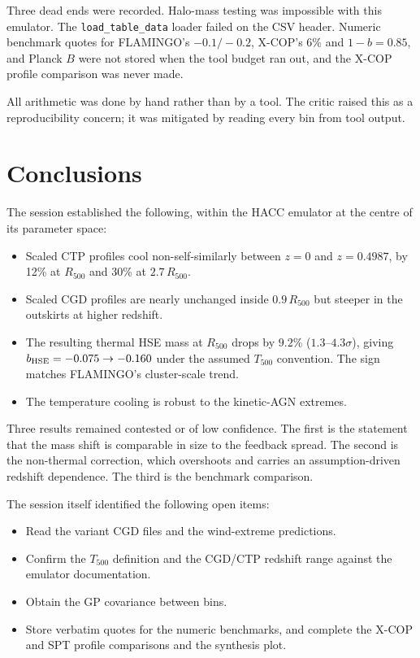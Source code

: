 \documentclass[11pt,a4paper]{article}
\begin{document}
Three dead ends were recorded. Halo-mass testing was impossible with this emulator. The \texttt{load\_table\_data} loader failed on the CSV header. Numeric benchmark quotes for FLAMINGO's $-0.1/-0.2$, X-COP's 6\% and $1-b=0.85$, and Planck $B$ were not stored when the tool budget ran out, and the X-COP profile comparison was never made.

All arithmetic was done by hand rather than by a tool. The critic raised this as a reproducibility concern; it was mitigated by reading every bin from tool output.

\section{Conclusions}
The session established the following, within the HACC emulator at the centre of its parameter space:
\begin{itemize}
\item Scaled CTP profiles cool non-self-similarly between $z=0$ and $z=0.4987$, by 12\% at $R_{500}$ and 30\% at $2.7\,R_{500}$.
\item Scaled CGD profiles are nearly unchanged inside $0.9\,R_{500}$ but steeper in the outskirts at higher redshift.
\item The resulting thermal HSE mass at $R_{500}$ drops by $9.2\%$ ($1.3$--$4.3\sigma$), giving $b_{\rm HSE}=-0.075\to-0.160$ under the assumed $T_{500}$ convention. The sign matches FLAMINGO's cluster-scale trend.
\item The temperature cooling is robust to the kinetic-AGN extremes.
\end{itemize}

Three results remained contested or of low confidence. The first is the statement that the mass shift is comparable in size to the feedback spread. The second is the non-thermal correction, which overshoots and carries an assumption-driven redshift dependence. The third is the benchmark comparison.

The session itself identified the following open items:
\begin{itemize}
\item Read the variant CGD files and the wind-extreme predictions.
\item Confirm the $T_{500}$ definition and the CGD/CTP redshift range against the emulator documentation.
\item Obtain the GP covariance between bins.
\item Store verbatim quotes for the numeric benchmarks, and complete the X-COP and SPT profile comparisons and the synthesis plot.
\end{itemize}
\end{document}
